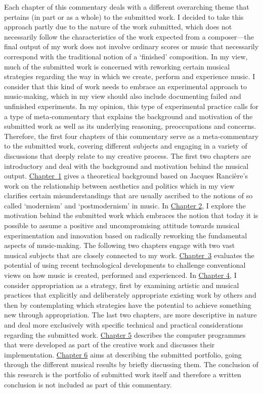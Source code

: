Each chapter of this commentary deals with a different overarching theme that pertains (in part or as a whole) to the submitted work. I decided to take this approach partly due to the nature of the work submitted, which does not necessarily follow the characteristics of the work expected from a composer---the final output of my work does not involve ordinary scores or music that necessarily correspond with the traditional notion of a `finished' composition. In my view, much of the submitted work is concerned with reworking certain musical strategies regarding the way in which we create, perform and experience music. I consider that this kind of work needs to embrace an experimental approach to music-making, which in my view should also include documenting failed and unfinished experiments. In my opinion, this type of experimental practice calls for a type of meta-commentary that explains the background and motivation of the submitted work as well as its underlying reasoning, preoccupations and concerns. Therefore, the first four chapters of this commentary serve as a meta-commentary to the submitted work, covering different subjects and engaging in a variety of discussions that deeply relate to my creative process. The first two chapters are introductory and deal with the background and motivation behind the musical output. \hyperlink{chapter1}{\mbox{Chapter 1}} gives a theoretical background based on Jacques Ranci\`{e}re's work on the relationship between aesthetics and politics which in my view clarifies certain misunderstandings that are usually ascribed to the notions of so called `modernism' and `postmodernism' in music. In \hyperlink{chapter2}{Chapter 2}, I explore the motivation behind the submitted work which embraces the notion that today it is possible to assume a positive and uncompromising attitude towards musical experimentation and innovation based on radically reworking the fundamental aspects of music-making. The following two chapters engage with two vast musical subjects that are closely connected to my work. \hyperlink{chapter3}{\mbox{Chapter 3}} evaluates the potential of using recent technological developments to challenge conventional views on how music is created, performed and experienced. In \hyperlink{chapter4}{Chapter 4}, I consider appropriation as a strategy, first by examining artistic and musical practices that explicitly and deliberately appropriate existing work by others and then by contemplating which strategies have the potential to achieve something new through appropriation. The last two chapters, are more descriptive in nature and deal more exclusively with specific technical and practical considerations regarding the submitted work. \hyperlink{chapter5}{Chapter 5} describes the computer programmes that were developed as part of the creative work and discusses their implementation. \hyperlink{chapter6}{Chapter 6} aims at describing the submitted portfolio, going through the different musical results by briefly discussing them. The conclusion of this research is the portfolio of submitted work itself and therefore a written conclusion is not included as part of this commentary.

\label{ch:preface}